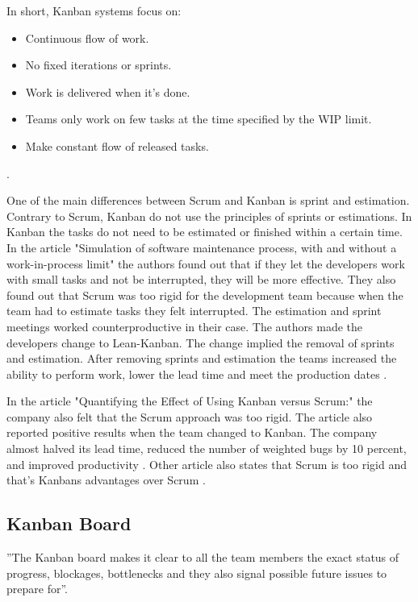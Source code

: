 \documentclass[UKenglish]{ifimaster}  %
\begin{document}
In short, Kanban systems focus on:
\begin{itemize}
\item Continuous flow of work.
\item	No fixed iterations or sprints.
\item Work is delivered when it's done.
\item Teams only work on few tasks at the time specified by the WIP limit.
\item Make constant flow of released tasks.
\end{itemize}
\parencite{DavidAnderson}.


One of the main differences between Scrum and Kanban is sprint and estimation. Contrary to Scrum, Kanban do not use the principles of sprints or estimations. In Kanban the tasks do not need to be estimated or finished within a certain time. In the article "Simulation of software maintenance process, with and without a work-in-process limit" \parencite{SMR:SMR1599} the authors found out that if they let the developers work with small tasks and not be interrupted, they will be more effective. They also found out that Scrum was too rigid for the development team because when the team had to estimate tasks they felt interrupted.  The estimation and sprint meetings worked counterproductive in their case. The authors made the developers change to Lean-Kanban.  The change implied the removal of sprints and estimation. After removing sprints and estimation the teams increased the ability to perform work, lower the lead time and meet the production dates \parencite{SMR:SMR1599}.

In the article "Quantifying the Effect of Using Kanban versus Scrum:" the company also felt that the Scrum approach was too rigid. The article also reported positive results when the team changed to Kanban.  The company almost halved its lead time, reduced the number of weighted bugs by 10 percent, and improved productivity \parencite{Dag}. Other article also states that Scrum is too rigid and that's Kanbans advantages over Scrum \parencite{beedle1999scrum} \parencite{brekkanintroducing} .  

\subsection {Kanban Board}
''The Kanban board makes it clear to all the team members the exact status of progress, blockages, bottlenecks and they also signal possible future issues to prepare for''\parencite{Joyce}.
\end{document}
